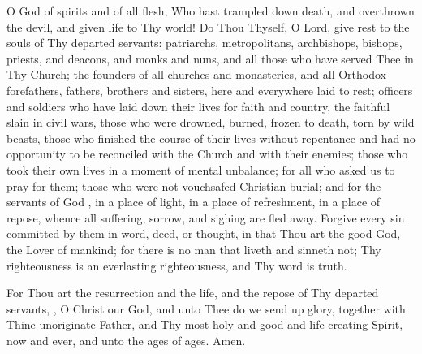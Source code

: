 O God of spirits and of all flesh, Who hast trampled down death, and overthrown the devil, and given life to Thy world! Do Thou Thyself, O Lord, give rest to the souls of Thy departed servants: patriarchs, metropolitans, archbishops, bishops, priests, and deacons, and monks and nuns, and all those who have served Thee in Thy Church; the founders of all churches and monasteries, and all Orthodox forefathers, fathers, brothers and sisters, here and everywhere laid to rest; officers and soldiers who have laid down their lives for faith and country, the faithful slain in civil wars, those who were drowned, burned, frozen to death, torn by wild beasts, those who finished the course of their lives without repentance and had no opportunity to be reconciled with the Church and with their enemies; those who took their own lives in a moment of mental unbalance; for all who asked us to pray for them; those who were not vouchsafed Christian burial; and for the servants of God , in a place of light, in a place of refreshment, in a place of repose, whence all suffering, sorrow, and sighing are fled away. Forgive every sin committed by them in word, deed, or thought, in that Thou art the good God, the Lover of mankind; for there is no man that liveth and sinneth not; Thy righteousness is an everlasting righteousness, and Thy word is truth.

For Thou art the resurrection and the life, and the repose of Thy departed servants, , O Christ our God, and unto Thee do we send up glory, together with Thine unoriginate Father, and Thy most holy and good and life-creating Spirit, now and ever, and unto the ages of ages. Amen.

\cleardoublepage
